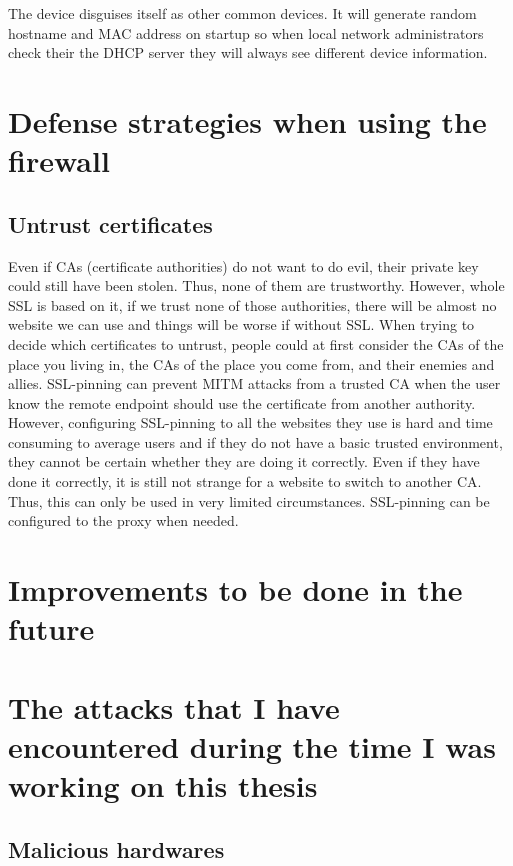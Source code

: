 \documentclass[mscthesis]{usiinfthesis}
\begin{document}
The device disguises itself as other common devices. It will generate random hostname and MAC address on startup so when local network administrators check their the DHCP server they will always see different device information.

\chapter{Defense strategies when using the firewall}

\section{Untrust certificates}

Even if CAs (certificate authorities) do not want to do evil, their private key could still have been stolen. Thus, none of them are trustworthy. However, whole SSL is based on it, if we trust none of those authorities, there will be almost no website we can use and things will be worse if without SSL. When trying to decide which certificates to untrust, people could at first consider the CAs of the place you living in, the CAs of the place you come from, and their enemies and allies. SSL-pinning can prevent MITM attacks from a trusted CA when the user know the remote endpoint should use the certificate from another authority. However, configuring SSL-pinning to all the websites they use is hard and time consuming to average users and if they do not have a basic trusted environment, they cannot be certain whether they are doing it correctly. Even if they have done it correctly, it is still not strange for a website to switch to another CA. Thus, this can only be used in very limited circumstances. SSL-pinning can be configured to the proxy when needed.

\chapter{Improvements to be done in the future}

\chapter{The attacks that I have encountered during the time I was working on this thesis}

\section{Malicious hardwares}
\end{document}
